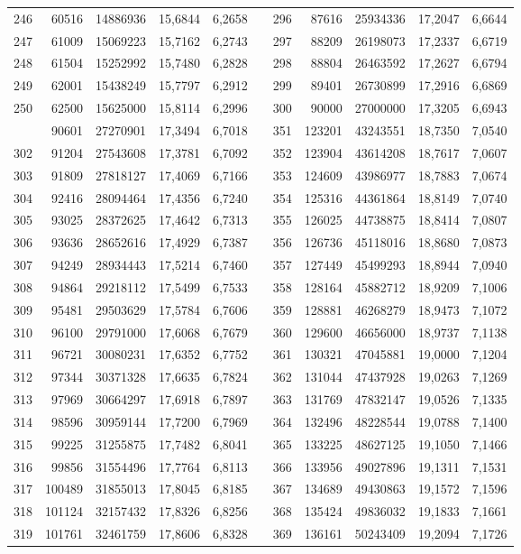\begin{longtable}{rrrrrrrrrrr}
246&60516&14886936&15,6844&6,2658&&296&87616&25934336&17,2047&6,6644\\
247&61009&15069223&15,7162&6,2743&&297&88209&26198073&17,2337&6,6719\\
248&61504&15252992&15,7480&6,2828&&298&88804&26463592&17,2627&6,6794\\
249&62001&15438249&15,7797&6,2912&&299&89401&26730899&17,2916&6,6869\\
250&62500&15625000&15,8114&6,2996&&300&90000&27000000&17,3205&6,6943\\
\newpage
301&90601&27270901&17,3494&6,7018&&351&123201&43243551&18,7350&7,0540\\
302&91204&27543608&17,3781&6,7092&&352&123904&43614208&18,7617&7,0607\\
303&91809&27818127&17,4069&6,7166&&353&124609&43986977&18,7883&7,0674\\
304&92416&28094464&17,4356&6,7240&&354&125316&44361864&18,8149&7,0740\\
305&93025&28372625&17,4642&6,7313&&355&126025&44738875&18,8414&7,0807\\
306&93636&28652616&17,4929&6,7387&&356&126736&45118016&18,8680&7,0873\\
307&94249&28934443&17,5214&6,7460&&357&127449&45499293&18,8944&7,0940\\
308&94864&29218112&17,5499&6,7533&&358&128164&45882712&18,9209&7,1006\\
309&95481&29503629&17,5784&6,7606&&359&128881&46268279&18,9473&7,1072\\
310&96100&29791000&17,6068&6,7679&&360&129600&46656000&18,9737&7,1138\\
311&96721&30080231&17,6352&6,7752&&361&130321&47045881&19,0000&7,1204\\
312&97344&30371328&17,6635&6,7824&&362&131044&47437928&19,0263&7,1269\\
313&97969&30664297&17,6918&6,7897&&363&131769&47832147&19,0526&7,1335\\
314&98596&30959144&17,7200&6,7969&&364&132496&48228544&19,0788&7,1400\\
315&99225&31255875&17,7482&6,8041&&365&133225&48627125&19,1050&7,1466\\
316&99856&31554496&17,7764&6,8113&&366&133956&49027896&19,1311&7,1531\\
317&100489&31855013&17,8045&6,8185&&367&134689&49430863&19,1572&7,1596\\
318&101124&32157432&17,8326&6,8256&&368&135424&49836032&19,1833&7,1661\\
319&101761&32461759&17,8606&6,8328&&369&136161&50243409&19,2094&7,1726\\

\end{longtable}
